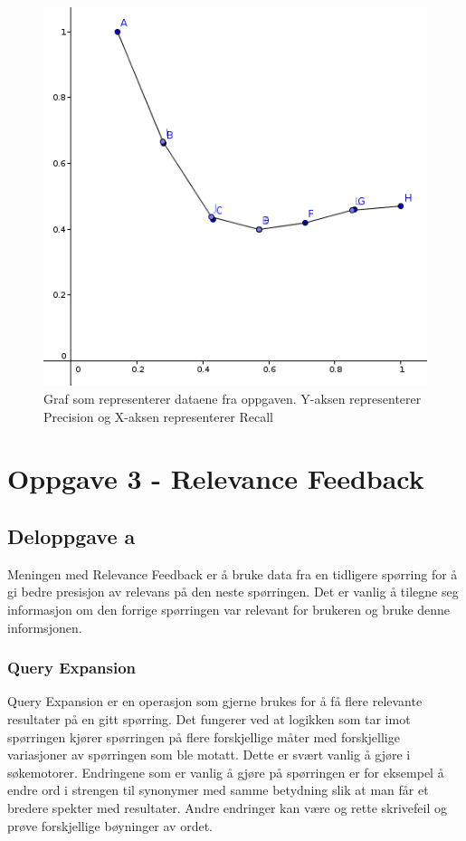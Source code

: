 \begin{figure}[ht!]
\centering
\includegraphics[scale=0.4]{interpolak.png}
\caption{Graf som representerer dataene fra oppgaven. Y-aksen representerer Precision og X-aksen representerer Recall}
\end{figure}

\pagebreak
\section*{Oppgave 3 - Relevance Feedback}
\subsection*{Deloppgave a}
Meningen med Relevance Feedback er å bruke data fra en tidligere spørring for å gi bedre presisjon av relevans på den neste spørringen. Det er vanlig å tilegne seg informasjon om den forrige spørringen var relevant for brukeren og bruke denne informsjonen. 
\subsubsection*{Query Expansion}
Query Expansion er en operasjon som gjerne brukes for å få flere relevante resultater på en gitt spørring. Det fungerer ved at logikken som tar imot spørringen kjører spørringen på flere forskjellige måter med forskjellige variasjoner av spørringen som ble motatt. Dette er svært vanlig å gjøre i søkemotorer. Endringene som er vanlig å gjøre på spørringen er for eksempel å endre ord i strengen til synonymer med samme betydning slik at man får et bredere spekter med resultater. Andre endringer kan være og rette skrivefeil og prøve forskjellige bøyninger av ordet.
